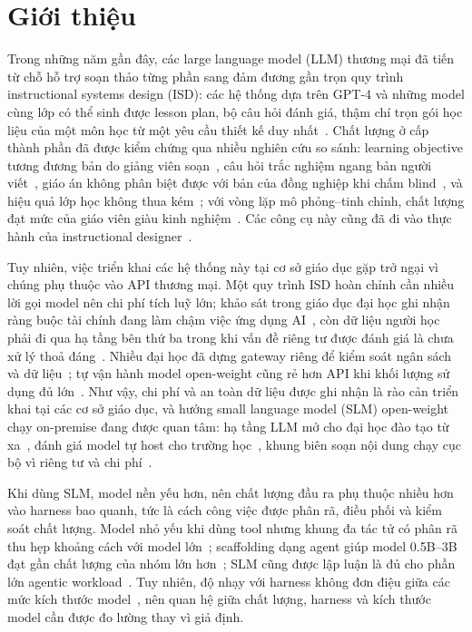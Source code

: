 \section{Giới thiệu}
\label{sec:introduction}

Trong những năm gần đây, các large language model (LLM) thương mại đã tiến từ chỗ hỗ
trợ soạn thảo từng phần sang đảm đương gần trọn quy trình instructional systems
design (ISD): các hệ thống dựa trên GPT-4 và những model cùng lớp có thể sinh được
lesson plan, bộ câu hỏi đánh giá, thậm chí trọn gói học liệu của một môn học từ một
yêu cầu thiết kế duy
nhất~\cite{yao2025instructionalagents,zhang2025eduplanner,agentlesson2026,zeng2026coma,hu2024teachingplan}.
Chất lượng ở cấp thành phần đã được kiểm chứng qua nhiều nghiên cứu so sánh:
learning objective tương đương bản do giảng viên soạn~\cite{doyle2025objectives},
câu hỏi trắc nghiệm ngang bản người viết~\cite{doughty2024mcq}, giáo án không phân
biệt được với bản của đồng nghiệp khi chấm
blind~\cite{cooper2026indistinguishable}, và hiệu quả lớp học không thua
kém~\cite{karaman2024chatgptlesson}; với vòng lặp mô phỏng--tinh chỉnh, chất lượng
đạt mức của giáo viên giàu kinh nghiệm~\cite{hu2025teachingsim}. Các công cụ này
cũng đã đi vào thực hành của instructional
designer~\cite{yang2025idpractice,lessonplanner2024}.

Tuy nhiên, việc triển khai các hệ thống này tại cơ sở giáo dục gặp trở ngại vì
chúng phụ thuộc vào API thương mại. Một quy trình ISD hoàn chỉnh cần nhiều lời gọi model nên
chi phí tích luỹ lớn; khảo sát trong giáo dục đại học ghi nhận ràng buộc tài chính
đang làm chậm việc ứng dụng AI~\cite{robert2025educause}, còn dữ liệu người học
phải đi qua hạ tầng bên thứ ba trong khi vấn đề riêng tư được đánh giá là chưa xử
lý thoả đáng~\cite{yan2024ethical}. Nhiều đại học đã dựng gateway riêng để kiểm
soát ngân sách và dữ liệu~\cite{mithun2025aiverde}; tự vận hành model open-weight
cũng rẻ hơn API khi khối lượng sử dụng đủ lớn~\cite{pan2025onpremise}. Như vậy,
chi phí và an toàn dữ liệu được ghi nhận là rào cản triển khai tại các cơ sở giáo
dục, và hướng small language model (SLM) open-weight chạy on-premise đang được
quan tâm: hạ tầng LLM mở cho đại học đào tạo từ xa~\cite{zesch2024flexi}, đánh giá
model tự host cho trường học~\cite{chan2026bigger}, khung biên soạn nội dung chạy
cục bộ vì riêng tư và chi phí~\cite{reza2025smallmodels}.

Khi dùng SLM, model nền yếu hơn, nên chất lượng đầu ra phụ thuộc nhiều hơn vào
harness bao quanh, tức là cách công việc được phân rã, điều phối và kiểm soát chất
lượng. Model nhỏ yếu khi dùng tool nhưng khung đa tác tử có phân rã thu hẹp khoảng
cách với model lớn~\cite{shen2024multillmagent}; scaffolding dạng agent giúp model
0.5B--3B đạt gần chất lượng của nhóm lớn hơn~\cite{kang2025agentdistill}; SLM cũng
được lập luận là đủ cho phần lớn agentic
workload~\cite{belcak2025slm,sharma2025slmagents}. Tuy nhiên, độ nhạy với harness
không đơn điệu giữa các mức kích thước model~\cite{cho2026harness}, nên quan hệ
giữa chất lượng, harness và kích thước model cần được đo lường thay vì giả định.

